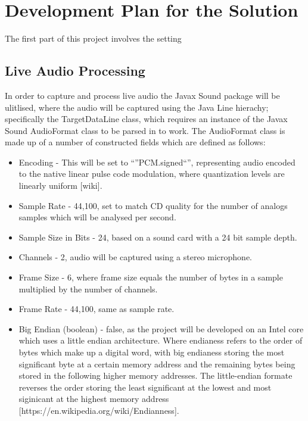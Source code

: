 \documentclass[a4paper, 11pt]{article}
\begin{document}
\maketitle{} 
\section{Development Plan for the Solution}

The first part of this project involves the setting 

\subsection{Live Audio Processing}
In order to capture and process live audio the Javax Sound package will be ulitlised, where the audio will be captured using the Java Line hierachy; specifically the TargetDataLine class, which requires an instance of the Javax Sound AudioFormat class to be parsed in to work. The AudioFormat class is made up of a number of constructed fields which are defined as follows:

\begin{itemize}
\item Encoding - This will be set to ``''PCM.signed``'', representing audio encoded to the native linear pulse code modulation, where quantization levels are linearly uniform [wiki].
\item Sample Rate - 44,100, set to match CD quality for the number of analogs samples which will be analysed per second. 
\item Sample Size in Bits - 24, based on a sound card with a 24 bit sample depth.
\item Channels - 2, audio will be captured using a stereo microphone.
\item Frame Size - 6, where frame size equals the number of bytes in a sample multiplied by the number of channels.
\item Frame Rate - 44,100, same as sample rate.
\item Big Endian (boolean) - false, as the project will be developed on an Intel core which uses a little endian architecture. Where endianess refers to the order of bytes which make up a digital word, with big endianess storing the most significant byte at a certain memory address and the remaining bytes being stored in the following higher memory addresses. The little-endian formate reverses the order storing the least significant at the lowest and most siginicant at the highest memory address [https://en.wikipedia.org/wiki/Endianness].
\end{itemize}
\end{document}
